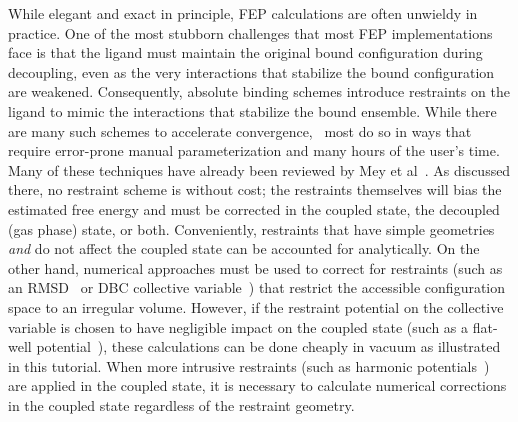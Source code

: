 \documentclass[9pt,tutorial]{Styling/livecoms}
\begin{document}
While elegant and exact in principle, FEP calculations are often unwieldy in practice.
One of the most stubborn challenges that most FEP implementations face is that the ligand must maintain the original bound configuration during decoupling, even as the very interactions that stabilize the bound configuration are weakened.
Consequently, absolute binding schemes introduce restraints on the ligand to mimic the interactions that stabilize the bound ensemble. 
While there are many such schemes to accelerate convergence,~\cite{Henin2017, Hermans1997, Boresch2003, Fu2017} most do so in ways that require error-prone manual parameterization and many hours of the user's time.
Many of these techniques have already been reviewed by Mey et al~\cite{Mey2020}. 
As discussed there, no restraint scheme is without cost; the restraints themselves will bias the estimated free energy and must be corrected in the coupled state, the decoupled (gas phase) state, or both.
Conveniently, restraints that have simple geometries \textit{and} do not affect the coupled state can be accounted for analytically. 
On the other hand, numerical approaches must be used to correct for restraints (such as an RMSD~\cite{Fu2017} or DBC collective variable~\cite{Salari2018}) that restrict the accessible configuration space to an irregular volume. However, if the restraint potential on the collective variable is chosen to have negligible impact on the coupled state (such as a flat-well potential~\cite{Helms1995}), %
these calculations can be done cheaply in vacuum as illustrated in this tutorial. When more intrusive restraints (such as harmonic potentials~\cite{Boresch2003, Fu2017}) are applied in the coupled state, it is necessary to calculate numerical corrections in the coupled state regardless of the restraint geometry.
\end{document}
